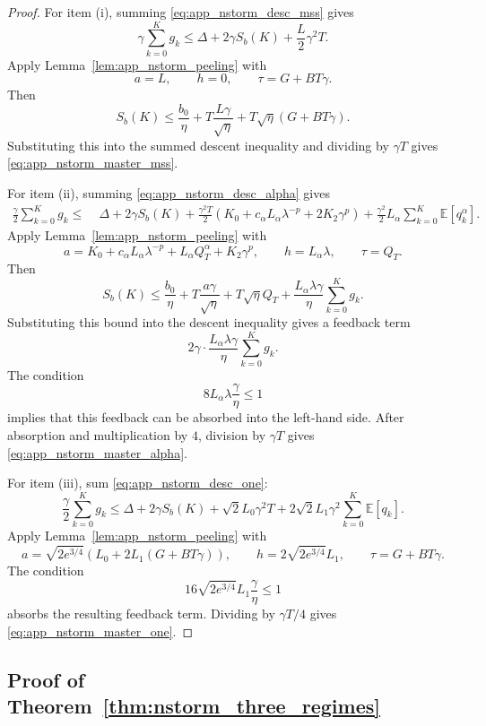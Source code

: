\documentclass[letter,11pt]{article}
\newcommand{\E}{\mathbb{E}}
\begin{document}
\begin{proof}
For item (i), summing \eqref{eq:app_nstorm_desc_mss} gives
\[
    \gamma\sum_{k=0}^K g_k
    \le
    \Delta
    +
    2\gamma S_b(K)
    +
    \frac{L}{2}\gamma^2T.
\]
Apply Lemma~\ref{lem:app_nstorm_peeling} with
\[
    a=L,
    \qquad
    h=0,
    \qquad
    \tau=G+BT\gamma.
\]
Then
\[
    S_b(K)
    \le
    \frac{b_0}{\eta}
    +
    T\frac{L\gamma}{\sqrt\eta}
    +
    T\sqrt\eta(G+BT\gamma).
\]
Substituting this into the summed descent inequality and dividing by
\(\gamma T\) gives \eqref{eq:app_nstorm_master_mss}.

For item (ii), summing \eqref{eq:app_nstorm_desc_alpha} gives
\[
\begin{aligned}
    \frac{\gamma}{2}\sum_{k=0}^K g_k
    \le\;&
    \Delta
    +
    2\gamma S_b(K)
    +
    \frac{\gamma^2T}{2}
    \left(
        K_0+c_\alpha L_\alpha\lambda^{-p}+2K_2\gamma^p
    \right)+
    \frac{\gamma^2}{2}L_\alpha
    \sum_{k=0}^K\E[q_k^\alpha].
\end{aligned}
\]
Apply Lemma~\ref{lem:app_nstorm_peeling} with
\[
    a=
    K_0+c_\alpha L_\alpha\lambda^{-p}+L_\alpha Q_T^\alpha+K_2\gamma^p,
    \qquad
    h=L_\alpha\lambda,
    \qquad
    \tau=Q_T.
\]
Then
\[
    S_b(K)
    \le
    \frac{b_0}{\eta}
    +
    T\frac{a\gamma}{\sqrt\eta}
    +
    T\sqrt\eta Q_T
    +
    \frac{L_\alpha\lambda\gamma}{\eta}
    \sum_{k=0}^K g_k.
\]
Substituting this bound into the descent inequality gives a feedback term
\[
    2\gamma\cdot
    \frac{L_\alpha\lambda\gamma}{\eta}
    \sum_{k=0}^K g_k.
\]
The condition
\[
    8L_\alpha\lambda\frac{\gamma}{\eta}\le1
\]
implies that this feedback can be absorbed into the left-hand side. After
absorption and multiplication by \(4\), division by \(\gamma T\) gives
\eqref{eq:app_nstorm_master_alpha}.

For item (iii), sum \eqref{eq:app_nstorm_desc_one}:
\[
    \frac{\gamma}{2}\sum_{k=0}^K g_k
    \le
    \Delta
    +
    2\gamma S_b(K)
    +
    \sqrt2L_0\gamma^2T
    +
    2\sqrt2L_1\gamma^2\sum_{k=0}^K\E[q_k].
\]
Apply Lemma~\ref{lem:app_nstorm_peeling} with
\[
    a=
    \sqrt{2e^{3/4}}
    \left(L_0+2L_1(G+BT\gamma)\right),
    \qquad
    h=2\sqrt{2e^{3/4}}L_1,
    \qquad
    \tau=G+BT\gamma.
\]
The condition
\[
    16\sqrt{2e^{3/4}}L_1\frac{\gamma}{\eta}\le1
\]
absorbs the resulting feedback term. Dividing by \(\gamma T/4\) gives
\eqref{eq:app_nstorm_master_one}.
\end{proof}

\subsection{Proof of Theorem~\ref{thm:nstorm_three_regimes}}
\label{app:nstorm_theorem_proof}
\end{document}
